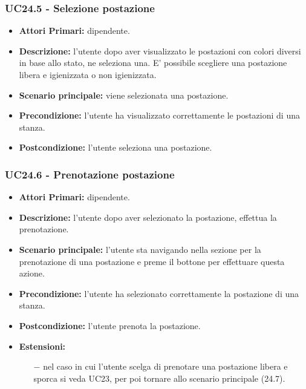 \subsubsection{ UC24.5 - Selezione postazione }
\begin{itemize}
	\item\textbf{Attori Primari:} dipendente.
	\item\textbf{Descrizione:} l’utente dopo aver visualizzato le postazioni con colori diversi in base allo stato, ne seleziona una. E' possibile scegliere una postazione libera e igienizzata o non igienizzata.
	\item\textbf{Scenario principale:} viene selezionata una postazione.
	\item\textbf{Precondizione:} l’utente ha visualizzato correttamente le postazioni di una stanza.
	\item\textbf{Postcondizione:} l’utente seleziona una postazione.
\end{itemize}
\subsubsection{ UC24.6 - Prenotazione postazione }
\begin{itemize}
	\item\textbf{Attori Primari:} dipendente.
	\item\textbf{Descrizione:} l’utente dopo aver selezionato la postazione, effettua la prenotazione. 
	\item\textbf{Scenario principale:} l’utente sta navigando nella sezione per la prenotazione di una postazione
	e preme il bottone per effettuare questa azione.
	\item\textbf{Precondizione:} l’utente ha selezionato correttamente la postazione di una stanza.
	\item\textbf{Postcondizione:} l'utente prenota la postazione.
	\item\textbf{Estensioni:}
	\begin{itemize}
		\item[$-$] nel caso in cui l'utente scelga di prenotare una postazione libera e sporca si veda UC23, per poi tornare allo scenario principale (24.7).
	\end{itemize}
\end{itemize}

